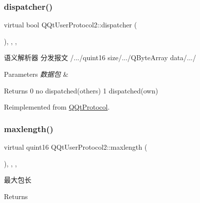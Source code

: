 \subsubsection{\texorpdfstring{dispatcher()}{dispatcher()}}
{\footnotesize\ttfamily virtual bool Q\+Qt\+User\+Protocol2\+::dispatcher (\begin{DoxyParamCaption}\item[{const Q\+Byte\+Array \&}]{ }\end{DoxyParamCaption})\hspace{0.3cm}{\ttfamily [inline]}, {\ttfamily [override]}, {\ttfamily [protected]}, {\ttfamily [virtual]}}



语义解析器 分发报文 /.../quint16 size/.../\+Q\+Byte\+Array data/.../ 


\begin{DoxyParams}{Parameters}
{\em 数据包} & \\
\hline
\end{DoxyParams}
\begin{DoxyReturn}{Returns}
0 no dispatched(others) 1 dispatched(own) 
\end{DoxyReturn}


Reimplemented from \mbox{\hyperlink{class_q_qt_protocol_a35a69c4b89c8cf7459038f40d75e0dc9}{Q\+Qt\+Protocol}}.

\mbox{\label{class_q_qt_user_protocol2_a7084a23f3bbb82fecf15986a318bd61f}} 
\subsubsection{\texorpdfstring{maxlength()}{maxlength()}}
{\footnotesize\ttfamily virtual quint16 Q\+Qt\+User\+Protocol2\+::maxlength (\begin{DoxyParamCaption}{ }\end{DoxyParamCaption})\hspace{0.3cm}{\ttfamily [inline]}, {\ttfamily [override]}, {\ttfamily [protected]}, {\ttfamily [virtual]}}



最大包长 

\begin{DoxyReturn}{Returns}

\end{DoxyReturn}



